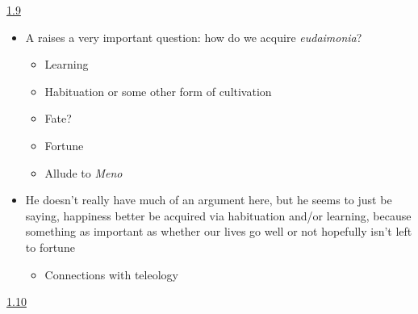 \documentclass[11pt]{article}
\begin{document}
\noindent\underline{1.9}

\begin{itemize}\item{A raises a very important question: how do we acquire \emph{eudaimonia}?}\begin{itemize}\item{Learning}\item{Habituation or some other form of cultivation}\item{Fate?}\item{Fortune}\item{Allude to \emph{Meno}}\end{itemize}

\item{He doesn't really have much of an argument here, but he seems to just be saying, happiness better be acquired via habituation and/or learning, because something as important as whether our lives go well or not hopefully isn't left to fortune}\begin{itemize}\item{Connections with teleology}\end{itemize}\end{itemize}

\noindent\underline{1.10}
\end{document}
